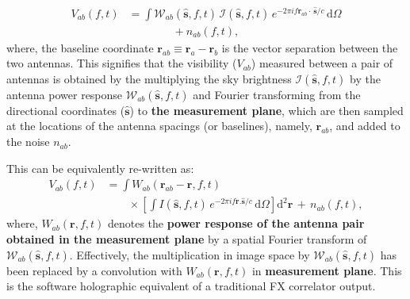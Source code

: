 \documentclass[a4paper,fleqn,usenatbib]{mnras}
\newcommand{\dif}{\mathrm{d}}
\begin{document}
\begin{align}\label{eqn:measurement-eqn-1}
  V_{ab}(f,t) &= \int \mathcal{W}_{ab}(\hat{\mathbf{s}},f,t)\,\mathcal{I}(\hat{\mathbf{s}},f,t)\,e^{-2\pi i f\mathbf{r}_{ab}\!\cdot\,\hat{\mathbf{s}}/c}\,\dif\Omega \nonumber\\
  &\qquad\qquad + n_{ab}(f,t),
\end{align}
where, the baseline coordinate $\mathbf{r}_{ab}\equiv\mathbf{r}_a-\mathbf{r}_b$ is the vector separation between the two antennas. This signifies that the visibility ($V_{ab}$) measured between a pair of antennas is obtained by the multiplying the sky brightness $\mathcal{I}(\hat{\mathbf{s}},f,t)$ by the antenna power response $\mathcal{W}_{ab}(\hat{\mathbf{s}},f,t)$ and Fourier transforming from the directional coordinates ($\hat{\mathbf{s}}$) to {\bf the measurement plane}, which are then sampled at the locations of the antenna spacings (or baselines), namely, $\mathbf{r}_{ab}$, and added to the noise $n_{ab}$. 

This can be equivalently re-written as:
\begin{align}\label{eqn:software-holography}
  V_{ab}(f,t) &= \int W_{ab}(\mathbf{r}_{ab}-\mathbf{r},f,t) \nonumber\\ 
              &\qquad \times \left[\int I(\hat{\mathbf{s}},f,t)\,e^{-2\pi i f\mathbf{r}.\hat{\mathbf{s}}/c}\,\dif\Omega\right]\dif^2\mathbf{r}\,+\, n_{ab}(f,t),
\end{align}
where, $W_{ab}(\mathbf{r},f,t)$ denotes the {\bf power response of the antenna pair obtained in the measurement plane} by a spatial Fourier transform of $\mathcal{W}_{ab}(\hat{\mathbf{s}},f,t)$. Effectively, the multiplication in image space by $\mathcal{W}_{ab}(\hat{\mathbf{s}},f,t)$ has been replaced by a convolution with $W_{ab}(\mathbf{r},f,t)$ in {\bf measurement plane}. This is the software holographic equivalent of a traditional FX correlator output. 
\end{document}
